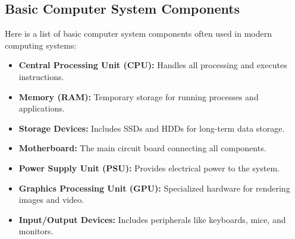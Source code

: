 \documentclass[12pt,a4paper]{article}
\begin{document}
\subsection*{Basic Computer System Components}
Here is a list of basic computer system components often used in modern computing systems:
\begin{itemize}
    \item \textbf{Central Processing Unit (CPU):} Handles all processing and executes instructions.
    \item \textbf{Memory (RAM):} Temporary storage for running processes and applications.
    \item \textbf{Storage Devices:} Includes SSDs and HDDs for long-term data storage.
    \item \textbf{Motherboard:} The main circuit board connecting all components.
    \item \textbf{Power Supply Unit (PSU):} Provides electrical power to the system.
    \item \textbf{Graphics Processing Unit (GPU):} Specialized hardware for rendering images and video.
    \item \textbf{Input/Output Devices:} Includes peripherals like keyboards, mice, and monitors.
\end{itemize}
\end{document}
